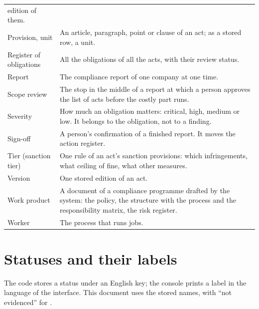 \begin{xltabular}{\textwidth}{@{}L{36mm}Y@{}}
  edition of them. \\
Provision, unit & An article, paragraph, point or clause of an act; as a stored row, a unit. \\
Register of obligations & All the obligations of all the acts, with their review status. \\
Report & The compliance report of one company at one time. \\
Scope review & The stop in the middle of a report at which a person approves the list of acts
  before the costly part runs. \\
Severity & How much an obligation matters: critical, high, medium or low. It belongs to the
  obligation, not to a finding. \\
Sign-off & A person's confirmation of a finished report. It moves the action register. \\
Tier (sanction tier) & One rule of an act's sanction provisions: which infringements, what
  ceiling of fine, what other measures. \\
Version & One stored edition of an act. \\
Work product & A document of a compliance programme drafted by the system: the policy, the
  structure with the process and the responsibility matrix, the risk register. \\
Worker & The process that runs jobs. \\
\end{xltabular}

\section{Statuses and their labels}\label{sec:glossary:labels}

The code stores a status under an English key; the console prints a label in the language of
the interface. This document uses the stored names, with \enquote{not evidenced} for
.

